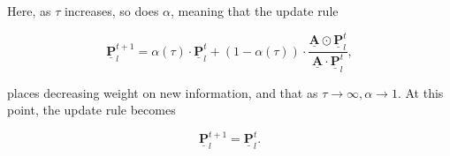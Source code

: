 Here, as $\tau$ increases, so does $\alpha$, meaning that the update rule

\begin{equation} 
    \underline{\mathbf{P}}^{t+1}_l = \alpha(\tau) \cdot \underline{\mathbf{P}}^{t}_l + (1 - \alpha(\tau)) \cdot  \frac{\underline{\mathbf{A}} \odot \underline{\mathbf{P}}^t_l}{\underline{\mathbf{A}} \cdot \underline{\mathbf{P}}^t_l},
\end{equation}

places decreasing weight on new information, and that as $\tau \rightarrow \infty, \alpha \rightarrow 1$. At this point, the update rule becomes

\begin{equation} 
    \underline{\mathbf{P}}^{t+1}_l = \underline{\mathbf{P}}^{t}_l .
\end{equation}
